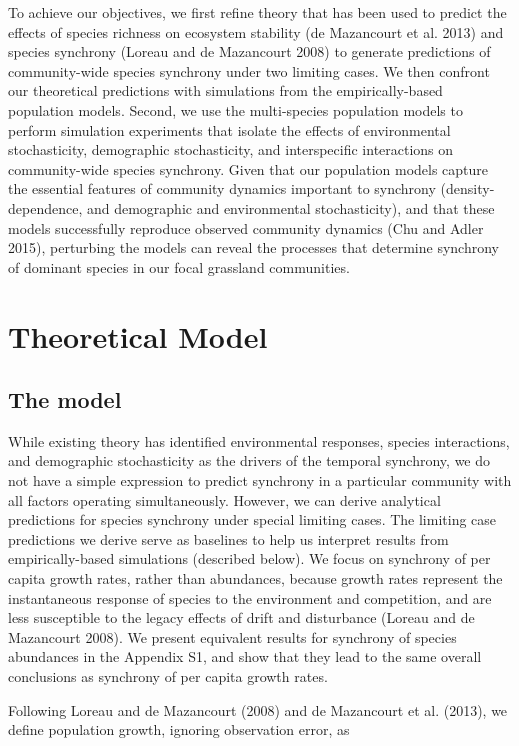 \documentclass[12pt,]{article}
\begin{document}
To achieve our objectives, we first refine theory that has been used to
predict the effects of species richness on ecosystem stability ({{de
Mazancourt}} et al. 2013) and species synchrony (Loreau and {{de
Mazancourt}} 2008) to generate predictions of community-wide species
synchrony under two limiting cases. We then confront our theoretical
predictions with simulations from the empirically-based population
models. Second, we use the multi-species population models to perform
simulation experiments that isolate the effects of environmental
stochasticity, demographic stochasticity, and interspecific interactions
on community-wide species synchrony. Given that our population models
capture the essential features of community dynamics important to
synchrony (density-dependence, and demographic and environmental
stochasticity), and that these models successfully reproduce observed
community dynamics (Chu and Adler 2015), perturbing the models can
reveal the processes that determine synchrony
of dominant species in our focal grassland
communities.

\section{Theoretical Model}\subsection{The model}

While existing theory has identified
environmental responses, species interactions, and demographic stochasticity as the drivers of the temporal synchrony,
we do not have a simple expression to predict synchrony in a particular
community with all factors operating simultaneously. However, we can
derive analytical predictions for species synchrony under special
limiting cases. The limiting case predictions we derive serve as
baselines to help us interpret results from empirically-based
simulations (described below). We focus on synchrony of per capita
growth rates, rather than abundances, because growth rates represent the
instantaneous response of species to the environment and competition,
and are less susceptible to the legacy effects of drift and disturbance
(Loreau and {{de Mazancourt}} 2008). We present equivalent results for
synchrony of species abundances in the Appendix S1, and show that they
lead to the same overall conclusions as synchrony of per capita growth
rates.

Following Loreau and {{de Mazancourt}} (2008) and {{de Mazancourt}} et
al. (2013), we define population growth, ignoring observation error, as
\end{document}
